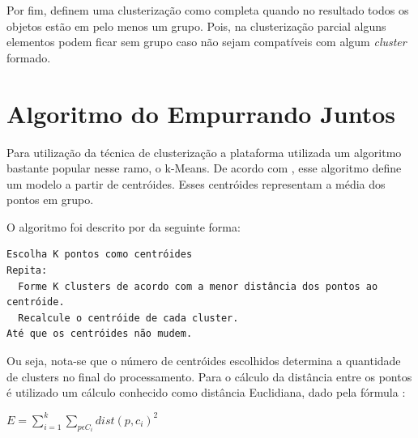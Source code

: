 Por fim,  definem uma clusterização como completa quando no resultado todos os objetos estão em pelo menos um grupo. Pois, na clusterização parcial alguns elementos podem ficar sem grupo caso não sejam compatíveis com algum \textit{cluster} formado.


\section{Algoritmo do Empurrando Juntos}

Para utilização da técnica de clusterização a plataforma utilizada um algoritmo bastante popular nesse ramo, o k-Means.
De acordo com , esse algoritmo define um modelo a partir de centróides. Esses centróides
representam a média dos pontos em grupo.

O algoritmo foi descrito por  da seguinte forma:

\lstset{language=HTML, numbers=left, stepnumber=1}
\begin{lstlisting}
Escolha K pontos como centróides
Repita:
  Forme K clusters de acordo com a menor distância dos pontos ao centróide.
  Recalcule o centróide de cada cluster.
Até que os centróides não mudem.
\end{lstlisting}

Ou seja, nota-se que o número de centróides escolhidos determina a quantidade de clusters no final do processamento.
Para o cálculo da distância entre os pontos é utilizado um cálculo conhecido como distância Euclidiana, dado pela fórmula \cite{tan2013data, han2011data}:

\begin{center}
  $E = \sum_{i=1}^{k} \sum_{p \epsilon C_i} dist(p, c_i)^2$
\end{center}

